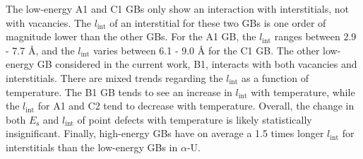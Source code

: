 \documentclass[review]{elsarticle}
\begin{document}


\par The low-energy A1 and C1 GBs only show an interaction with interstitials, not with vacancies. The $l_{\mathrm{int}}$ of an interstitial for these two GBs is one order of magnitude lower than the other GBs. For the A1 GB, the  $l_{\mathrm{int}}$ ranges between 2.9 - 7.7 {\AA}, and the  $l_{\mathrm{int}}$ varies between 6.1 - 9.0 {\AA} for the C1 GB. The other low-energy GB considered in the current work, B1, interacts with both vacancies and interstitials. There are mixed trends regarding the  $l_{\mathrm{int}}$ as a function of temperature. The B1 GB tends to see an increase in  $l_{\mathrm{int}}$ with temperature, while the $l_{\mathrm{int}}$ for A1 and C2 tend to decrease with temperature. Overall, the change in both $E_{\mathrm{s}}$ and  $l_{\mathrm{int}}$ of point defects with temperature is likely statistically insignificant. Finally, high-energy GBs have on average a 1.5 times longer $l_{\mathrm{int}}$ for interstitials than the low-energy GBs in $\alpha$-U. %
\end{document}

